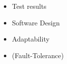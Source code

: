 \begin{itemize}
  \item Test results
  \item Software Design
  \item Adaptability
  \item (Fault-Tolerance)
\end{itemize}






